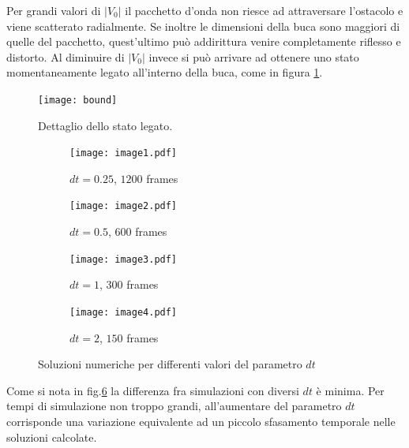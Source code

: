 Per grandi valori di $|V_0|$ il pacchetto d'onda non riesce ad attraversare l'ostacolo e viene scatterato radialmente. Se inoltre le dimensioni della buca sono maggiori di quelle del pacchetto, quest'ultimo può addirittura venire completamente riflesso e distorto. Al diminuire di $|V_0|$ invece si può arrivare ad ottenere uno stato momentaneamente legato all'interno della buca, come in figura \ref{fig:bound}.

\begin{figure}[H]
\centering
\texttt{[image: bound]}
\caption{Dettaglio dello stato legato.}
\label{fig:bound}
\end{figure}

\begin{figure}[H]
 \begin{subfigure}[b]{0.5\textwidth}
  \centering
  \texttt{[image: image1.pdf]}
  \caption{$dt=0.25$, $1200$ frames}
  \label{fig:image1}
 \end{subfigure}
 \begin{subfigure}[b]{0.5\textwidth}
  \centering
  \texttt{[image: image2.pdf]}
  \caption{$dt=0.5$, $600$ frames}
  \label{fig:image2}
 \end{subfigure}

 \quad

 \begin{subfigure}[b]{0.5\textwidth}
  \centering
  \texttt{[image: image3.pdf]}
  \caption{$dt=1$, $300$ frames}
  \label{fig:image3}
 \end{subfigure}
 \begin{subfigure}[b]{0.5\textwidth}
  \centering
  \texttt{[image: image4.pdf]}
  \caption{$dt=2$, $150$ frames}
  \label{fig:image4}
 \end{subfigure}

 \caption{Soluzioni numeriche per differenti valori del parametro $dt$}\label{fig:images_dt}
\end{figure}

Come si nota in fig.\ref{fig:images_dt} la differenza fra simulazioni con diversi $dt$ è minima. Per tempi di simulazione non troppo grandi, all'aumentare del parametro $dt$ corrisponde una variazione equivalente ad un piccolo sfasamento temporale nelle soluzioni calcolate.


